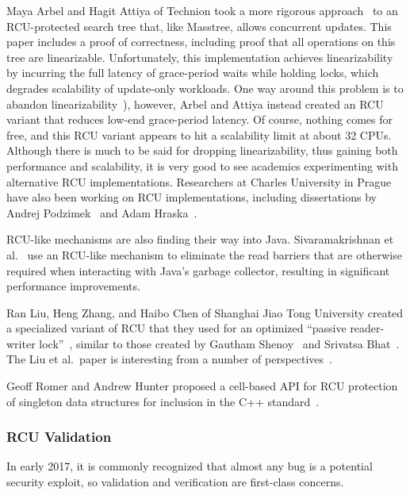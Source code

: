 Maya Arbel and Hagit Attiya of Technion took a more rigorous
approach~\cite{MayaArbel2014RCUtree} to an RCU-protected search tree that,
like Masstree, allows concurrent updates.
This paper includes a proof of correctness, including proof that all
operations on this tree are linearizable.
Unfortunately, this implementation achieves linearizability by incurring
the full latency of grace-period waits while holding locks, which degrades
scalability of update-only workloads.
One way around this problem is to abandon
linearizability~\cite{AndreasHaas2012FIFOisnt,PaulEMcKennneyAtomicTreeN4037}),
however, Arbel and Attiya instead created an RCU variant that reduces
low-end grace-period latency.
Of course, nothing comes for free, and this RCU variant appears to hit
a scalability limit at about 32 CPUs.
Although there is much to be said for dropping linearizability, thus
gaining both performance and scalability, it is very good to see academics
experimenting with alternative RCU implementations.
Researchers at Charles University in Prague have also been
working on RCU implementations, including dissertations by
Andrej Podzimek~\cite{AndrejPodzimek2010masters} and Adam
Hraska~\cite{AdamHraska2013RCUHelenOS}.

RCU-like mechanisms are also finding their way into Java.
Sivaramakrishnan et al.~\cite{Sivaramakrishnan:2012:ERB:2258996.2259005}
use an RCU-like mechanism to eliminate the read barriers that are
otherwise required when interacting with Java's garbage collector,
resulting in significant performance improvements.

Ran Liu, Heng Zhang, and Haibo Chen of Shanghai Jiao Tong University
created a specialized variant of RCU that they used for an optimized
``passive reader-writer lock''~\cite{RanLiu2014PassiveRWLock}, similar to
those created by Gautham Shenoy~\cite{GauthamShenoy2006RCUrwlock} and
Srivatsa Bhat~\cite{SrivatsaSBhat2014RCUrwlock}.
The Liu et al.~paper is interesting from a number of
perspectives~\cite{PaulEMcKenney2014ReadMostly}.

Geoff Romer and Andrew Hunter proposed a cell-based API for RCU
protection of singleton data structures for inclusion in the
C++ standard~\cite{GeoffRomer2017C++DeferredReclamation}.

\subsubsection{RCU Validation}
\label{sec:defer:RCU Validation}

In early 2017, it is commonly recognized that almost any bug is a potential
security exploit, so validation and verification are first-class concerns.

